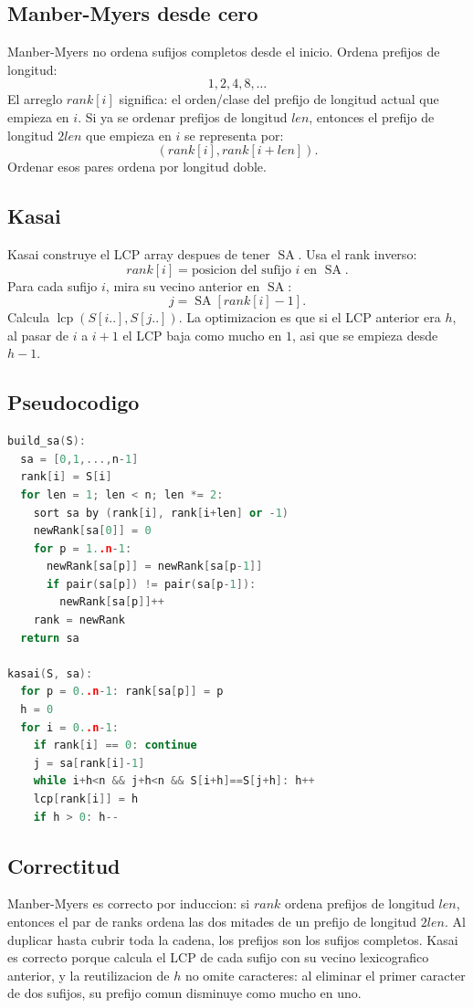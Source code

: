 \documentclass[10pt]{article}
\newcommand{\SA}{\operatorname{SA}}
\newcommand{\lcp}{\operatorname{lcp}}
\begin{document}
\subsection{Manber-Myers desde cero}
Manber-Myers no ordena sufijos completos desde el inicio. Ordena prefijos de
longitud:
\[
1,2,4,8,\ldots
\]
El arreglo $rank[i]$ significa: el orden/clase del prefijo de longitud actual
que empieza en $i$. Si ya se ordenar prefijos de longitud $len$, entonces el
prefijo de longitud $2len$ que empieza en $i$ se representa por:
\[
(rank[i],rank[i+len]).
\]
Ordenar esos pares ordena por longitud doble.

\subsection{Kasai}
Kasai construye el LCP array despues de tener $\SA$. Usa el rank inverso:
\[
rank[i]=\text{posicion del sufijo }i\text{ en }\SA.
\]
Para cada sufijo $i$, mira su vecino anterior en $\SA$:
\[
j=\SA[rank[i]-1].
\]
Calcula $\lcp(S[i..],S[j..])$. La optimizacion es que si el LCP anterior era
$h$, al pasar de $i$ a $i+1$ el LCP baja como mucho en $1$, asi que se empieza
desde $h-1$.

\subsection{Pseudocodigo}
\begin{lstlisting}[language=C++]
build_sa(S):
  sa = [0,1,...,n-1]
  rank[i] = S[i]
  for len = 1; len < n; len *= 2:
    sort sa by (rank[i], rank[i+len] or -1)
    newRank[sa[0]] = 0
    for p = 1..n-1:
      newRank[sa[p]] = newRank[sa[p-1]]
      if pair(sa[p]) != pair(sa[p-1]):
        newRank[sa[p]]++
    rank = newRank
  return sa

kasai(S, sa):
  for p = 0..n-1: rank[sa[p]] = p
  h = 0
  for i = 0..n-1:
    if rank[i] == 0: continue
    j = sa[rank[i]-1]
    while i+h<n && j+h<n && S[i+h]==S[j+h]: h++
    lcp[rank[i]] = h
    if h > 0: h--
\end{lstlisting}

\subsection{Correctitud}
Manber-Myers es correcto por induccion: si $rank$ ordena prefijos de longitud
$len$, entonces el par de ranks ordena las dos mitades de un prefijo de longitud
$2len$. Al duplicar hasta cubrir toda la cadena, los prefijos son los sufijos
completos. Kasai es correcto porque calcula el LCP de cada sufijo con su vecino
lexicografico anterior, y la reutilizacion de $h$ no omite caracteres: al
eliminar el primer caracter de dos sufijos, su prefijo comun disminuye como
mucho en uno.
\end{document}
